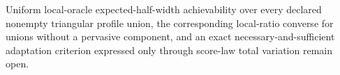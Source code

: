 Uniform local-oracle expected-half-width achievability over every declared nonempty triangular profile union, the corresponding local-ratio converse for unions without a pervasive component, and an exact necessary-and-sufficient adaptation criterion expressed only through score-law total variation remain open.